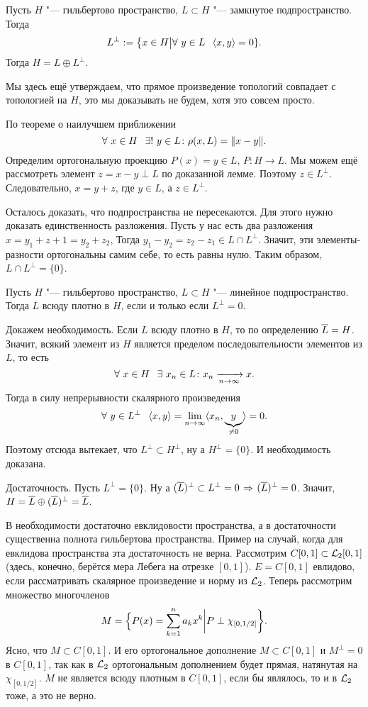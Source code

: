 \begin{The}
  Пусть $H$ "--- гильбертово пространство, $L\subset H$ "--- замкнутое подпространство. Тогда
\[
  L^{\perp} := \big\{x\in H\big|\forall\ y\in L\pau \la x,y\ra =0\}.
\]
Тогда $H = L\oplus L^{\perp}$.
\end{The}
Мы здесь ещё утверждаем, что прямое произведение топологий совпадает с топологией на $H$, это мы доказывать не будем, хотя это совсем просто.
\begin{Proof}
  По теореме о наилучшем приближении 
\[
 \forall\ x\in H\pau \exists!\ y\in L\colon \rho(x,L) = \|x-y\|.
\]
Определим ортогональную проекцию $P(x) = y\in L$, $P\colon H\to L$. Мы можем ещё рассмотреть элемент $z = x-y\perp L$ по доказанной лемме. Поэтому $z\in L^{\perp}$. Следовательно, $x = y+z$, где $y\in L$, а $z\in L^{\perp}$.

Осталось доказать, что подпространства не пересекаются. Для этого нужно доказать единственность разложения. Пусть у нас есть два разложения $x = y_1+z+1 = y_2+ z_2$, Тогда $y_1-y_2=z_2-z_1\in L\cap L^{\perp}$. Значит, эти элементы-разности ортогональны самим себе, то есть равны нулю. Таким образом, $L\cap L^{\perp} = \{0\}$.
\end{Proof}
\begin{Sl}
   Пусть $H$ "--- гильбертово пространство, $L\subset H$ "--- линейное подпространство. Тогда $L$ всюду плотно в $H$, если и только если $L^\perp =0$.
\end{Sl}
\begin{Proof}
  Докажем необходимость. Если $L$ всюду плотно в $H$, то по определению $\overline{L}=H$. Значит, всякий элемент из $H$ является пределом последовательности элементов из $L$, то есть 
\[
  \forall\ x\in H\pau \exists\ x_n\in L\colon x_n\te x.
\]
Тогда в силу непрерывности скалярного произведения 
\[
  \forall\ y\in L^\perp\hskip .75em plus.1em minus.08em\relax \langle x,y\rangle = \lim\limits_{n\rightarrow\infty} \langle x_n,\underbrace{y}_{\ne0}\rangle = 0.
\]
Поэтому отсюда вытекает, что $L^\perp\subset H^\perp$, ну а $H^{\perp} = \{0\}$. И необходимость доказана.

Достаточность. Пусть $L^\perp = \{0\}$. Ну а $(\ol L)^\perp\subset L^\perp = 0\imp (\ol L)^\perp=0$. Значит, $H = \overline{L}\oplus {(\overline{L})^\perp} = \overline{L}$.
\end{Proof}

В необходимости достаточно евклидовости пространства, а в достаточности существенна полнота гильбертова пространства.
Пример на случай, когда для евклидова пространства эта достаточность не верна. Рассмотрим $C[0,1]\subset \mathcal L_2[0,1]$ (здесь, конечно, берётся мера Лебега на отрезке $[0,1]$). $E = C[0,1]$ евлидово, если рассматривать скалярное произведение и норму из $\mathcal L_2$. Теперь рассмотрим множество многочленов 
\[
  M = \Big\{P(x) = \sum\limits_{k = 1}^{n}a_kx^k\bigg| P\perp\chi_{[0,1/2]}\bigg\}.
\]
Ясно, что $M\subset C[0,1]$.
И его ортогональное дополнение $M\subset C[0,1]$ и $M^\perp=0$ в $C[0,1]$, так как в $\mathcal L_2$ ортогональным дополнением будет прямая, натянутая на $\chi_{[0,1/2]}$. $M$ не является всюду плотным в $C[0,1]$, если бы являлось, то и в $\mathcal L_2$ тоже, а это не верно.

